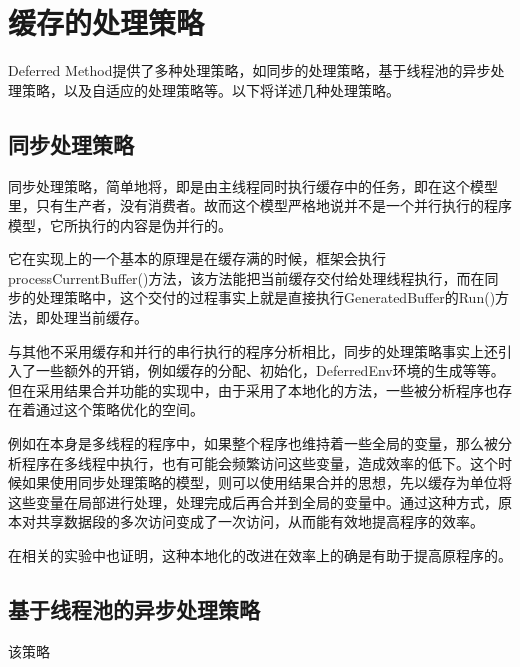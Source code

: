 \section{缓存的处理策略}

Deferred Method提供了多种处理策略，如同步的处理策略，基于线程池的异步处理策略，以及自适应的处理策略等。以下将详述几种处理策略。

\subsection{同步处理策略}

同步处理策略，简单地将，即是由主线程同时执行缓存中的任务，即在这个模型里，只有生产者，没有消费者。故而这个模型严格地说并不是一个并行执行的程序模型，它所执行的内容是伪并行的。

它在实现上的一个基本的原理是在缓存满的时候，框架会执行processCurrentBuffer()方法，该方法能把当前缓存交付给处理线程执行，而在同步的处理策略中，这个交付的过程事实上就是直接执行GeneratedBuffer的Run()方法，即处理当前缓存。

与其他不采用缓存和并行的串行执行的程序分析相比，同步的处理策略事实上还引入了一些额外的开销，例如缓存的分配、初始化，DeferredEnv环境的生成等等。但在采用结果合并功能的实现中，由于采用了本地化的方法，一些被分析程序也存在着通过这个策略优化的空间。

例如在本身是多线程的程序中，如果整个程序也维持着一些全局的变量，那么被分析程序在多线程中执行，也有可能会频繁访问这些变量，造成效率的低下。这个时候如果使用同步处理策略的模型，则可以使用结果合并的思想，先以缓存为单位将这些变量在局部进行处理，处理完成后再合并到全局的变量中。通过这种方式，原本对共享数据段的多次访问变成了一次访问，从而能有效地提高程序的效率。

在相关的实验中也证明，这种本地化的改进在效率上的确是有助于提高原程序的。

\subsection{基于线程池的异步处理策略}

该策略
